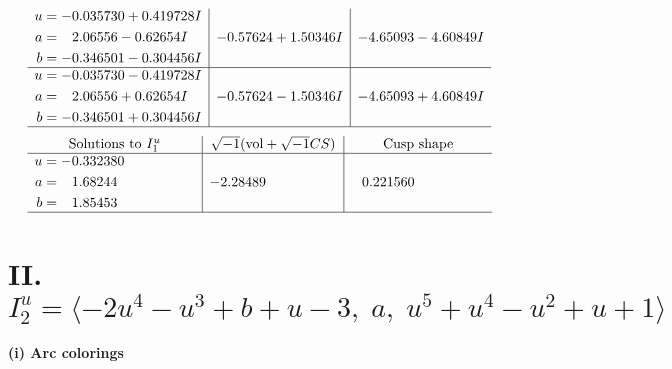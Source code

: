 \documentclass[1p]{elsarticle_modified}
\theoremstyle{definition}
\newcommand{\I}{\sqrt{-1}}
\begin{document}
$$\begin{array}{c|c|c}
\begin{aligned}
u &= -0.035730 + 0.419728 I \\
a &= \phantom{-}2.06556 - 0.62654 I \\
b &= -0.346501 - 0.304456 I\end{aligned}
 & -0.57624 + 1.50346 I & -4.65093 - 4.60849 I \\ \hline\begin{aligned}
u &= -0.035730 - 0.419728 I \\
a &= \phantom{-}2.06556 + 0.62654 I \\
b &= -0.346501 + 0.304456 I\end{aligned}
 & -0.57624 - 1.50346 I & -4.65093 + 4.60849 I\\
 \hline 
 \end{array}$$\newpage$$\begin{array}{c|c|c}  
\text{Solutions to }I^u_{1}& \I (\text{vol} + \sqrt{-1}CS) & \text{Cusp shape}\\
 \hline 
\begin{aligned}
u &= -0.332380\phantom{ +0.000000I} \\
a &= \phantom{-}1.68244\phantom{ +0.000000I} \\
b &= \phantom{-}1.85453\phantom{ +0.000000I}\end{aligned}
 & -2.28489\phantom{ +0.000000I} & \phantom{-}0.221560\phantom{ +0.000000I}\\
 \hline 
 \end{array}$$\newpage\newpage\renewcommand{\arraystretch}{1}
\centering \section*{II. $I^u_{2}= \langle -2 u^4- u^3+b+u-3,\;a,\;u^5+u^4- u^2+u+1 \rangle$}
\flushleft \textbf{(i) Arc colorings}\\
\end{document}
